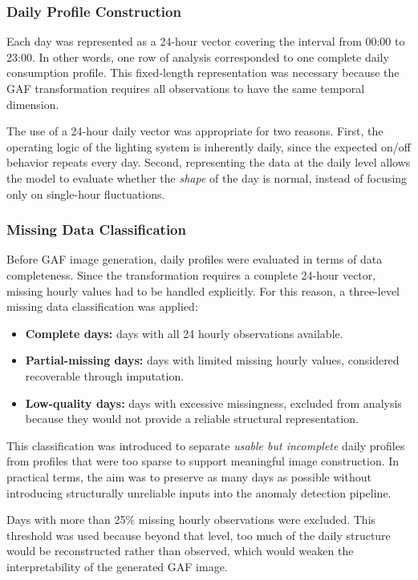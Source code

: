 \documentclass{article}
\begin{document}
\subsubsection{Daily Profile Construction}

Each day was represented as a 24-hour vector covering the interval from 00:00 to 23:00. In other words, one row of analysis corresponded to one complete daily consumption profile. This fixed-length representation was necessary because the GAF transformation requires all observations to have the same temporal dimension.

The use of a 24-hour daily vector was appropriate for two reasons. First, the operating logic of the lighting system is inherently daily, since the expected on/off behavior repeats every day. Second, representing the data at the daily level allows the model to evaluate whether the \emph{shape} of the day is normal, instead of focusing only on single-hour fluctuations.

\subsubsection{Missing Data Classification}

Before GAF image generation, daily profiles were evaluated in terms of data completeness. Since the transformation requires a complete 24-hour vector, missing hourly values had to be handled explicitly. For this reason, a three-level missing data classification was applied:

\begin{itemize}
    \item \textbf{Complete days:} days with all 24 hourly observations available.
    \item \textbf{Partial-missing days:} days with limited missing hourly values, considered recoverable through imputation.
    \item \textbf{Low-quality days:} days with excessive missingness, excluded from analysis because they would not provide a reliable structural representation.
\end{itemize}

This classification was introduced to separate \emph{usable but incomplete} daily profiles from profiles that were too sparse to support meaningful image construction. In practical terms, the aim was to preserve as many days as possible without introducing structurally unreliable inputs into the anomaly detection pipeline.

Days with more than 25\% missing hourly observations were excluded. This threshold was used because beyond that level, too much of the daily structure would be reconstructed rather than observed, which would weaken the interpretability of the generated GAF image.
\end{document}
